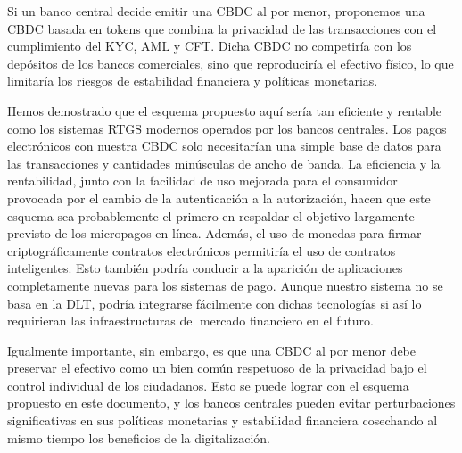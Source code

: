 \documentclass[10pt,spanish]{article}
\begin{document}
Si un banco central decide emitir una CBDC al por menor, proponemos una
CBDC basada en tokens que combina la privacidad de las transacciones con
el cumplimiento del KYC, AML y CFT. Dicha CBDC no competiría con los
depósitos de los bancos comerciales, sino que reproduciría el efectivo
físico, lo que limitaría los riesgos de estabilidad financiera y
políticas monetarias.

Hemos demostrado que el esquema propuesto aquí sería tan eficiente y
rentable como los sistemas RTGS modernos operados por los bancos
centrales. Los pagos electrónicos con nuestra CBDC solo necesitarían una
simple base de datos para las transacciones y cantidades minúsculas de
ancho de banda. La eficiencia y la rentabilidad, junto con la facilidad
de uso mejorada para el consumidor provocada por el cambio de la
autenticación a la autorización, hacen que este esquema sea
probablemente el primero en respaldar el objetivo largamente previsto de
los micropagos en línea. Además, el uso de monedas para firmar
criptográficamente contratos electrónicos permitiría el uso de contratos
inteligentes. Esto también podría conducir a la aparición de
aplicaciones completamente nuevas para los sistemas de pago. Aunque
nuestro sistema no se basa en la DLT, podría integrarse fácilmente con
dichas tecnologías si así lo requirieran las infraestructuras del
mercado financiero en el futuro.

Igualmente importante, sin embargo, es que una CBDC al por menor debe
preservar el efectivo como un bien común respetuoso de la privacidad
bajo el control individual de los ciudadanos. Esto se puede lograr con
el esquema propuesto en este documento, y los bancos centrales pueden
evitar perturbaciones significativas en sus políticas monetarias y
estabilidad financiera cosechando al mismo tiempo los beneficios de la
digitalización.


\newpage


\end{document}
